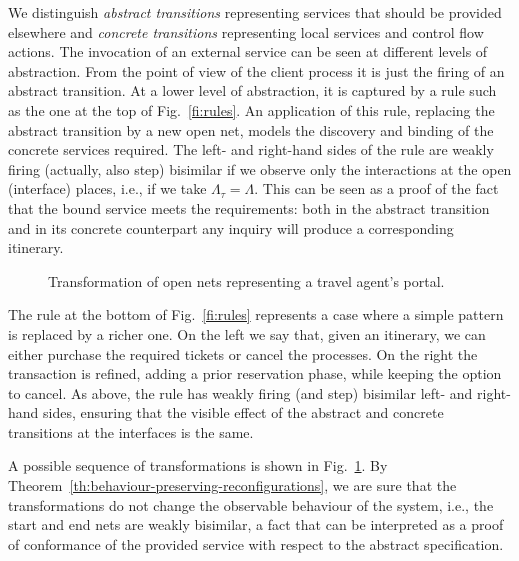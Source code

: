 \documentclass{LMCS}
\begin{document}
We distinguish \emph{abstract transitions} representing services that
should be provided elsewhere and \emph{concrete transitions}
representing local services and control flow actions. The invocation
of an external service can be seen at different levels of
abstraction. From the point of view of the client process it is just
the firing of an abstract transition. At a lower level of abstraction,
it is captured by a rule such as the one at
the top of Fig.~\ref{fi:rules}. An application of this rule, replacing
the abstract transition by a new open net, models the discovery and
binding of the concrete services required.
The left- and right-hand sides of the rule are weakly firing (actually,
also step) bisimilar if we observe only the interactions at the open
(interface) places, i.e., if we take $\Lambda_\tau = \Lambda$. This
can be seen as a proof of the fact that the bound service meets the
requirements: both in the abstract transition and in its concrete
counterpart any inquiry will produce a corresponding itinerary.

\begin{figure}[t]
  \begin{center}
  \end{center}

  \caption{Transformation of open nets representing a travel agent's portal.}
  \label{fi:portal}
\end{figure}

The rule at the bottom of Fig.~\ref{fi:rules} represents a case where
a simple pattern is replaced by a richer one. On the left we say that,
given an itinerary, we can either purchase the required tickets or
cancel the processes. On the right the transaction is refined, adding
a prior reservation phase, while keeping the option to cancel. As
above, the rule has weakly firing (and step) bisimilar left- and right-hand
sides, ensuring that the visible effect of the abstract and concrete
transitions at the interfaces is the same.

A possible sequence of transformations is shown in
Fig.~\ref{fi:portal}.
By Theorem~\ref{th:behaviour-preserving-reconfigurations}, we are sure
that the transformations do not change the observable behaviour
of the system, i.e., the start and end nets are weakly bisimilar, a
fact that can be interpreted as a proof of conformance of the provided
service with respect to the abstract specification.
\end{document}
